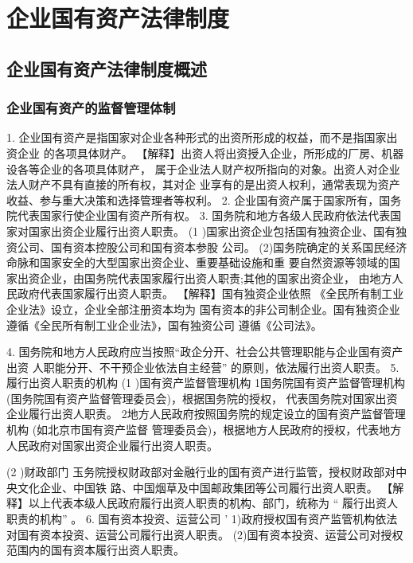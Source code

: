 \documentclass[UTF8,12pt]{ctexart}
\numberwithin{equation}{section} %
\numberwithin{figure}{section}
\numberwithin{table}{section}
\begin{document}
	
	\newpage
	\section{企业国有资产法律制度}
	
	\subsection{企业国有资产法律制度概述}
	\subsubsection{企业国有资产的监督管理体制}
	
	1. 企业国有资产是指国家对企业各种形式的出资所形成的权益，而不是指国家出资企业
	的各项具体财产。
	【解释】出资人将出资授入企业，所形成的厂房、机器设各等企业的各项具体财产，
	属于企业法人财产权所指向的对象。出资人对企业法人财产不具有直接的所有权，其对企
	业享有的是出资人权利，通常表现为资产收益、参与重大决策和选择管理者等权利。
	2. 企业国有资产属于国家所有，国务院代表国家行使企业国有资产所有权。
	3. 国务院和地方各级人民政府依法代表国家对国家出资企业履行出资人职责。
	(1 )国家出资企业包括国有独资企业、国有独资公司、国有资本控股公司和国有资本参股
	公司。
	(2)国务院确定的关系国民经济命脉和国家安全的大型国家出资企业、重要基础设施和重
	要自然资源等领域的国家出资企业，由国务院代表国家履行出资人职责;其他的国家出资企业，
	由地方人民政府代表国家履行出资人职责。
	【解释】国有独资企业依照 《全民所有制工业企业法》设立，企业全部注册资本均为
	国有资本的非公司制企业。国有独资企业遵循《全民所有制工业企业法》，国有独资公司
	遵循《公司法》。
	
	4. 国务院和地方人民政府应当按照“政企分开、社会公共管理职能与企业国有资产出资
	人职能分开、不干预企业依法自主经营” 的原则，依法履行出资人职责。
	5. 履行出资人职责的机构
	(1 )国有资产监督管理机构
	1国务院国有资产监督管理机构(国务院国有资产监督管理委员会)，根据国务院的授权，
	代表国务院对国家出资企业履行出资人职责。
	2地方人民政府按照国务院的规定设立的国有资产监督管理机构 (如北京市国有资产监督
	管理委员会)，根据地方人民政府的授权，代表地方人民政府对国家出资企业履行出资人职责。
	
	(2 )财政部门
	玉务院授权财政部对金融行业的国有资产进行监管，授权财政部对中央文化企业、中国铁
	路、中国烟草及中国邮政集团等公司履行出资人职责。
	【解释】以上代表本级人民政府履行出资人职责的机构、部门，统称为 “ 履行出资人
	职责的机构” 。
	6. 国有资本投资、运营公司
	' 1)政府授权国有资产监管机构依法对国有资本投资、运营公司履行出资人职责。
	(2)国有资本投资、运营公司对授权范围内的国有资本履行出资人职责。
	
\end{document}
